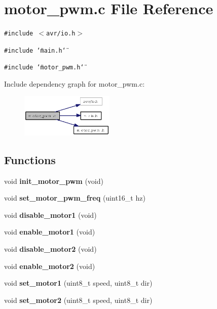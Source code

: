 \section{motor\_\-pwm.c File Reference}
\label{motor__pwm_8c}
{\tt \#include $<$avr/io.h$>$}\par
{\tt \#include \char`\"{}main.h\char`\"{}}\par
{\tt \#include \char`\"{}motor\_\-pwm.h\char`\"{}}\par


Include dependency graph for motor\_\-pwm.c:\begin{figure}[H]
\begin{center}
\leavevmode
\includegraphics[width=126pt]{motor__pwm_8c__incl}
\end{center}
\end{figure}
\subsection*{Functions}
\begin{CompactItemize}
\item 
void {\bf init\_\-motor\_\-pwm} (void)
\item 
void {\bf set\_\-motor\_\-pwm\_\-freq} (uint16\_\-t hz)
\item 
void {\bf disable\_\-motor1} (void)
\item 
void {\bf enable\_\-motor1} (void)
\item 
void {\bf disable\_\-motor2} (void)
\item 
void {\bf enable\_\-motor2} (void)
\item 
void {\bf set\_\-motor1} (uint8\_\-t speed, uint8\_\-t dir)
\item 
void {\bf set\_\-motor2} (uint8\_\-t speed, uint8\_\-t dir)
\end{CompactItemize}
